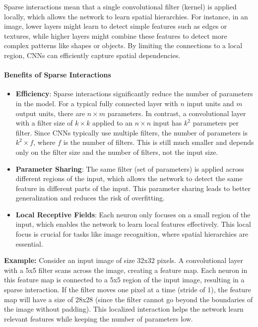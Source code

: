 \documentclass[english,11pt,a4paper,titlepage]{article}
\begin{document}
	Sparse interactions mean that a single convolutional filter (kernel) is applied locally, which allows the network to learn spatial hierarchies. For instance, in an image, lower layers might learn to detect simple features such as edges or textures, while higher layers might combine these features to detect more complex patterns like shapes or objects. By limiting the connections to a local region, CNNs can efficiently capture spatial dependencies.
	
	\paragraph{Benefits of Sparse Interactions}
	\begin{itemize}
		\item \textbf{Efficiency}: Sparse interactions significantly reduce the number of parameters in the model. For a typical fully connected layer with \(n\) input units and \(m\) output units, there are \(n \times m\) parameters. In contrast, a convolutional layer with a filter size of \(k \times k\) applied to an \(n \times n\) input has \(k^2\) parameters per filter. Since CNNs typically use multiple filters, the number of parameters is \( k^2 \times f \), where \( f \) is the number of filters. This is still much smaller and depends only on the filter size and the number of filters, not the input size.
		\item \textbf{Parameter Sharing}: The same filter (set of parameters) is applied across different regions of the input, which allows the network to detect the same feature in different parts of the input. This parameter sharing leads to better generalization and reduces the risk of overfitting.
		\item \textbf{Local Receptive Fields}: Each neuron only focuses on a small region of the input, which enables the network to learn local features effectively. This local focus is crucial for tasks like image recognition, where spatial hierarchies are essential.
	\end{itemize}
	
	\textbf{Example:} Consider an input image of size 32x32 pixels. A convolutional layer with a 5x5 filter scans across the image, creating a feature map. Each neuron in this feature map is connected to a 5x5 region of the input image, resulting in a sparse interaction. If the filter moves one pixel at a time (stride of 1), the feature map will have a size of 28x28 (since the filter cannot go beyond the boundaries of the image without padding). This localized interaction helps the network learn relevant features while keeping the number of parameters low.\\
	
\end{document}
